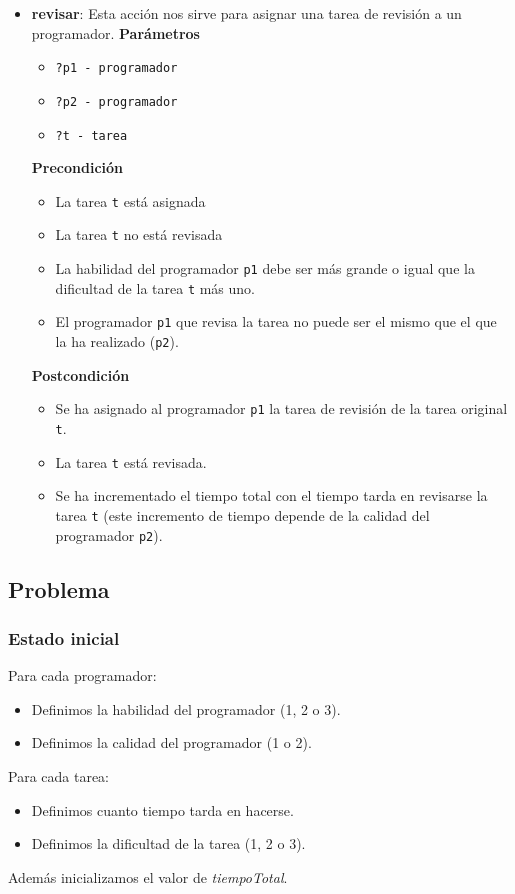 \documentclass[11pt]{article}
\begin{document}
\begin{itemize}
	\item \textbf{revisar}: Esta acción nos sirve para asignar una tarea de revisión a un programador. 
	\textbf{Parámetros}
	\begin{itemize}
		\item \texttt{?p1 - programador}
		\item \texttt{?p2 - programador}
		\item \texttt{?t - tarea}
	\end{itemize}
	\textbf{Precondición}
	\begin{itemize}
		\item La tarea \texttt{t} está asignada
		\item La tarea \texttt{t} no está revisada
		\item La habilidad del programador \texttt{p1} debe ser más grande o igual que la dificultad de la tarea \texttt{t} más uno.
		\item El programador \texttt{p1} que revisa la tarea no puede ser el mismo que el que la ha realizado (\texttt{p2}). 
	\end{itemize}
	\textbf{Postcondición}
	\begin{itemize}	
		\item Se ha asignado al programador \texttt{p1} la tarea de revisión de la tarea original \texttt{t}.
		\item La tarea \texttt{t} está revisada. 
		\item Se ha incrementado el tiempo total con el tiempo tarda en revisarse la tarea \texttt{t} (este incremento de tiempo depende de la calidad del programador \texttt{p2}).
	\end{itemize}
	
\end{itemize}

\subsection{Problema}
\subsubsection{Estado inicial}
\noindent
Para cada programador:
\begin{itemize}
  	\item Definimos la habilidad del programador (1, 2 o 3).
  	\item Definimos la calidad del programador (1 o 2).
\end{itemize}

Para cada tarea:
\begin{itemize}
  	\item Definimos cuanto tiempo tarda en hacerse.
  	\item Definimos la dificultad de la tarea (1, 2 o 3).
\end{itemize}
Además inicializamos el valor de \textit{tiempoTotal}. 
\end{document}
